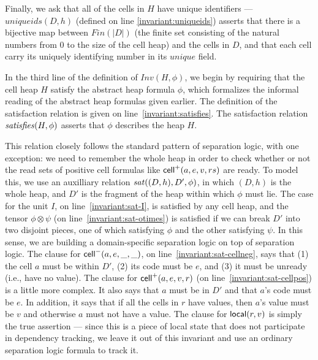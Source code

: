 \documentclass[natbib]{sigplanconf}
\begin{document}
Finally, we ask that all of the cells in $H$ have unique identifiers
--- $\mathit{uniqueids}(D,h)$ (defined on line \ref{invariant:uniqueids}) 
asserts that there is a bijective map
between $Fin(|D|)$ (the finite set consisting of the natural numbers
from 0 to the size of the cell heap) and the cells in $D$, and that 
each cell carry its uniquely identifying number in its $unique$ field.

In the third line of the definition of $Inv(H, \phi)$, we begin by
requiring that the cell heap $H$ satisfy the abstract heap formula
$\phi$, which formalizes the informal reading of the abstract heap
formulas given earlier. The definition of the satisfaction relation is
given on line~\ref{invariant:satisfies}. The satisfaction relation
$\mathit{satisfies}({H}, {\phi})$ asserts that $\phi$ describes the heap $H$. 

This relation closely follows the standard pattern of separation
logic, with one exception: we need to remember the whole heap in order
to check whether or not the read sets of positive cell formulas like
$\mbox{\textsf{{cell}}}^{+}({a}, {e}, {v}, {rs})$ are ready. To model this, we use an auxilliary
relation $\mathit{sat}((D,h), D', \phi)$, in which $(D,h)$ is the whole heap, and 
$D'$ is the fragment of the heap within which $\phi$ must lie. The case for
the unit $I$, on line~\ref{invariant:sat-I}, is satisfied by any cell
heap, and the tensor $\phi \otimes \psi$ (on line~\ref{invariant:sat-otimes}) 
is satisfied if we can break $D'$ into two disjoint pieces, one of which
satisfying $\phi$ and the other satisfying $\psi$. In this sense, we are
building a domain-specific separation logic on top of separation logic. 
The clause for $\mbox{\textsf{{cell}}}^{-}({a}, {e}, {\_}, {\_})$, on line~\ref{invariant:sat-cellneg}, says
that (1) the cell $a$ must be within $D'$, (2) its code must be $e$, and
(3) it must be unready (i.e., have no value). The clause for $\mbox{\textsf{{cell}}}^{+}({a}, {e}, {v}, {r})$
(on line~\ref{invariant:sat-cellpos}) is a little more complex. It also says that 
$a$ must be in $D'$ and that $a$'s code must be $e$. In addition, it says that 
if all the cells in $r$ have values, then $a$'s value must be $v$ and otherwise 
$a$ must not have a value. The clause for $\mbox{\textsf{{local}}}({r}, {v})$ is simply
the true assertion --- since this is a piece of local state that does not 
participate in dependency tracking, we leave it out of this 
invariant and use an ordinary separation logic formula to track it. 
\end{document}
